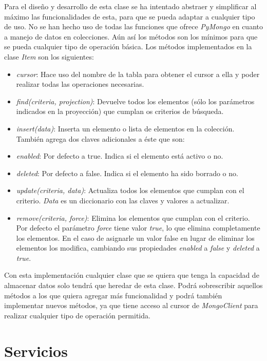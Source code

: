 \bigskip
Para el diseño y desarrollo de esta clase se ha intentado abstraer y simplificar al máximo las funcionalidades de esta, para que se pueda adaptar a cualquier tipo de uso. No se han hecho uso de todas las funciones que ofrece \textit{PyMongo} en cuanto a manejo de datos en colecciones. Aún así los métodos son los mínimos para que se pueda cualquier tipo de operación básica. Los métodos implementados en la clase \textit{Item} son los siguientes:
\begin{itemize}
	\item \textit{cursor}: Hace uso del nombre de la tabla para obtener el cursor a ella y poder realizar todas las operaciones necesarias.
	\item \textit{find(criteria, projection)}: Devuelve todos los elementos (sólo los parámetros indicados en la proyección) que cumplan os criterios de búsqueda.
	\item \textit{insert(data)}: Inserta un elemento o lista de elementos en la colección. También agrega dos claves adicionales a éste que son:
	\item \textit{enabled}: Por defecto a true. Indica si el elemento está activo o no.
	\item \textit{deleted}: Por defecto a false. Indica si el elemento ha sido borrado o no.
	\item \textit{update(criteria, data)}: Actualiza todos los elementos que cumplan con el criterio. \textit{Data} es un diccionario con las claves y valores a actualizar.
	\item \textit{remove(criteria, force)}: Elimina los elementos que cumplan con el criterio. Por defecto el parámetro \textit{force} tiene valor \textit{true}, lo que elimina completamente los elementos. En el caso de asignarle un valor false en lugar de eliminar los elementos los modifica, cambiando sus propiedades \textit{enabled} a \textit{false} y \textit{deleted} a \textit{true}.
\end{itemize}



\bigskip
Con esta implementación cualquier clase que se quiera que tenga la capacidad de almacenar datos solo tendrá que heredar de esta clase. Podrá sobrescribir aquellos métodos a los que quiera agregar más funcionalidad y podrá también implementar nuevos métodos, ya que tiene acceso al cursor de \textit{MongoClient} para realizar cualquier tipo de operación permitida.




\section{Servicios}
\label{sec:servicios}



